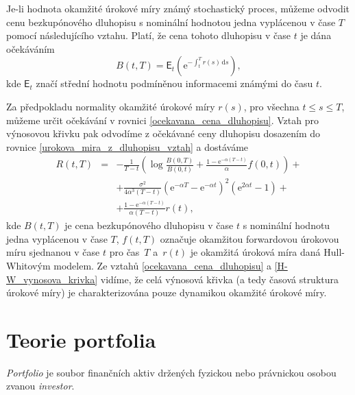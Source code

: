 \documentclass[a4paper,12pt]{report}
\theoremstyle{definition} \newtheorem{definice}[veta]{Definice}
\theoremstyle{remark}
\begin{document}
Je-li hodnota okamžité úrokové míry známý stochastický proces, můžeme odvodit cenu bezkupónového dluhopisu s nominální hodnotou jedna vyplácenou v čase $T$ pomocí následujícího vztahu.
Platí, že cena tohoto dluhopisu v čase $t$ je dána očekáváním
\begin{equation}\label{ocekavana_cena_dluhopisu}
B(t,T)=\mathsf{E}_t\left(\mathrm{e}^{-\int_{t}^T r(s)\,\mathrm{d}s}\right),
\end{equation}
kde $\mathsf{E}_t$ značí střední hodnotu podmíněnou informacemi známými do času $t$.

Za předpokladu normality okamžité úrokové míry $r(s)$, pro všechna $t\leq s\leq T$, můžeme určit očekávání v rovnici \eqref{ocekavana_cena_dluhopisu}.
Vztah pro výnosovou křivku pak odvodíme z očekávané ceny dluhopisu dosazením do rovnice \eqref{urokova_mira_z_dluhopisu_vztah} a dostáváme
\begin{eqnarray}\label{H-W_vynosova_krivka}
R(t,T)&=&-\frac{1}{T-t}\left(\log \frac{B(0,T)}{B(0,t)}+\frac{1-\mathrm{e}^{-\alpha(T-t)}}{\alpha}f(0,t)\right)+ \nonumber\\
&&+\frac{\sigma^2}{4\alpha^3(T-t)}\left(\mathrm{e}^{-\alpha T}-\mathrm{e}^{-\alpha t}\right)^2\left(\mathrm{e}^{2\alpha t}-1\right)+  \nonumber\\
&&+\frac{1-\mathrm{e}^{-\alpha(T-t)}}{\alpha(T-t)}r(t),
\end{eqnarray}
kde $B(t,T)$ je cena bezkupónového dluhopisu v čase $t$ %
s nominální hodnotu jedna vyplácenou v čase $T$,
$f(t,T)$ označuje okamžitou forwardovou úrokovou míru sjednanou v čase $t$ pro čas~$T$ 
a~$r(t)$ je okamžitá úroková míra daná Hull-Whitovým modelem.
Ze vztahů \eqref{ocekavana_cena_dluhopisu} a \eqref{H-W_vynosova_krivka} vidíme, že celá výnosová křivka (a tedy časová struktura úrokové míry) je charakterizována pouze dynamikou okamžité úrokové míry.


\chapter{Teorie portfolia}
\textit{Portfolio} je soubor finančních aktiv držených fyzickou nebo právnickou osobou zvanou \textit{investor}.
\end{document}
